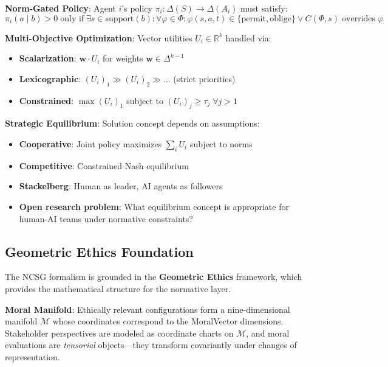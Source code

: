 \documentclass[conference]{IEEEtran}
\begin{document}
\textbf{Norm-Gated Policy}: Agent $i$'s policy $\pi_i: \Delta(S) \to \Delta(A_i)$ must satisfy:
\begin{equation}
\pi_i(a \mid b) > 0 \;\text{only if}\; \exists s \in \text{support}(b): \forall \varphi \in \Phi: \varphi(s, a, t) \in \{\text{permit}, \text{oblige}\} \lor C(\Phi, s) \;\text{overrides}\; \varphi
\end{equation}

\textbf{Multi-Objective Optimization}: Vector utilities $U_i \in \mathbb{R}^k$ handled via:
\begin{itemize}
\item \textbf{Scalarization}: $\mathbf{w} \cdot U_i$ for weights $\mathbf{w} \in \Delta^{k-1}$
\item \textbf{Lexicographic}: $(U_i)_1 \gg (U_i)_2 \gg \ldots$ (strict priorities)
\item \textbf{Constrained}: $\max (U_i)_1$ subject to $(U_i)_j \geq \tau_j\;\forall j > 1$
\end{itemize}

\textbf{Strategic Equilibrium}: Solution concept depends on assumptions:
\begin{itemize}
\item \textbf{Cooperative}: Joint policy maximizes $\sum_i U_i$ subject to norms
\item \textbf{Competitive}: Constrained Nash equilibrium
\item \textbf{Stackelberg}: Human as leader, AI agents as followers
\item \textbf{Open research problem}: What equilibrium concept is appropriate for human-AI teams under normative constraints?
\end{itemize}

\subsection{Geometric Ethics Foundation}

The NCSG formalism is grounded in the \textbf{Geometric Ethics} framework, which provides the mathematical structure for the normative layer.

\textbf{Moral Manifold}: Ethically relevant configurations form a nine-dimensional manifold $\mathcal{M}$ whose coordinates correspond to the MoralVector dimensions. Stakeholder perspectives are modeled as coordinate charts on $\mathcal{M}$, and moral evaluations are \emph{tensorial} objects---they transform covariantly under changes of representation.
\end{document}
